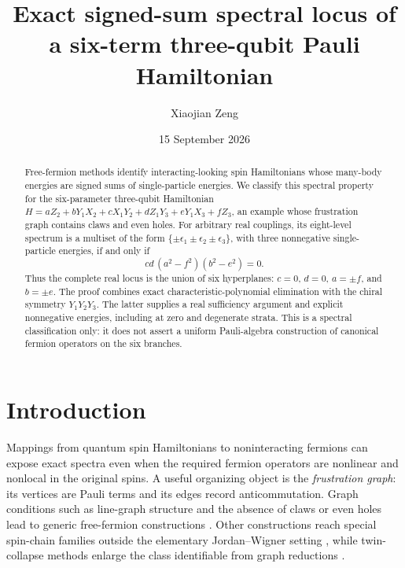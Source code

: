 \documentclass[
  aps,
  pra,
  reprint,
  superscriptaddress,
  nofootinbib,
  longbibliography
]{revtex4-2}
\begin{document}
\title{Exact signed-sum spectral locus of a six-term three-qubit Pauli Hamiltonian}

\author{Xiaojian Zeng}

\date{15 September 2026}

\begin{abstract}
Free-fermion methods identify interacting-looking spin Hamiltonians whose many-body
energies are signed sums of single-particle energies.  We classify this spectral
property for the six-parameter three-qubit Hamiltonian
\(H=aZ_2+bY_1X_2+cX_1Y_2+dZ_1Y_3+eY_1X_3+fZ_3\), an example whose frustration
graph contains claws and even holes.  For arbitrary real couplings, its eight-level
spectrum is a multiset of the form
\(\{\pm\epsilon_1\pm\epsilon_2\pm\epsilon_3\}\), with three nonnegative
single-particle energies, if and only if
\[
 c d\,(a^2-f^2)(b^2-e^2)=0.
\]
Thus the complete real locus is the union of six hyperplanes: \(c=0\), \(d=0\),
\(a=\pm f\), and \(b=\pm e\).  The proof combines exact characteristic-polynomial
elimination with the chiral symmetry \(Y_1Y_2Y_3\).  The latter supplies a real
sufficiency argument and explicit nonnegative energies, including at zero and
degenerate strata.  This is a spectral classification only: it does not assert a
uniform Pauli-algebra construction of canonical fermion operators on the six
branches.
\end{abstract}

\maketitle

\section{Introduction}

Mappings from quantum spin Hamiltonians to noninteracting fermions can expose exact
spectra even when the required fermion operators are nonlinear and nonlocal in the
original spins.  A useful organizing object is the \emph{frustration graph}: its
vertices are Pauli terms and its edges record anticommutation.  Graph conditions such
as line-graph structure and the absence of claws or even holes lead to generic
free-fermion constructions \cite{Elman2021,Chapman2023}.  Other constructions reach
special spin-chain families outside the elementary Jordan--Wigner setting
\cite{FendleyPozsgay2024,FukaiVonaPozsgay2025}, while twin-collapse methods enlarge the
class identifiable from graph reductions \cite{RuhElman2026}.
\end{document}

